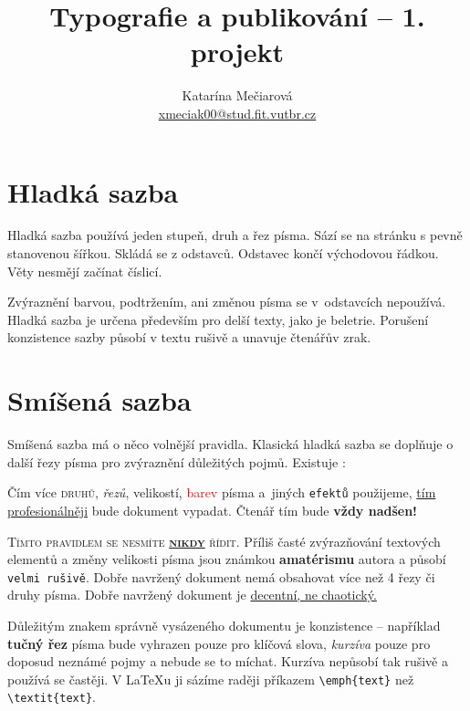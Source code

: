 \documentclass[a4paper, 10pt, twocolumn]{article}[25.2.2024]
\title{Typografie a publikování -- 1. projekt}
\author{Katarína Mečiarová\\ \href{mailto: xmeciak00@stud.fit.vutbr.cz}{xmeciak00@stud.fit.vutbr.cz}}
\date{ }
\begin{document}
    \maketitle


    \section{Hladká sazba}
        Hladká sazba používá jeden stupeň, druh a řez písma.
        Sází se na stránku s pevně stanovenou šířkou.
        Skládá se z odstavců. Odstavec končí východovou řádkou.
        Věty nesmějí začínat číslicí.

        Zvýraznění barvou, podtržením, ani změnou písma se v~odstavcích nepoužívá.
        Hladká sazba je určena především pro delší texty, jako je beletrie.
        Porušení konzistence sazby působí v textu rušivě a unavuje čtenářův zrak.

    \section{Smíšená sazba}
        Smíšená sazba má o něco volnější pravidla.
        Klasická hladká sazba se doplňuje o další řezy písma pro zvýraznění důležitých pojmů.
        Existuje :

        \medskip
        \begin{adjustwidth}{0.75cm}{0.75cm}
        \hspace{0.3cm}
        Čím více \textsc{druhů}, \emph{řezů}, {\scriptsize velikostí}, \textcolor{red}{barev} písma a~jiných \texttt{efektů} použijeme, \underline{tím profesionálněji}
        bude {\selectfont dokument} vypadat. Čtenář tím bude {\Large \bfseries vždy nadšen!}
        \end{adjustwidth}
        \medskip

        \textsc{Tímto pravidlem se nesmíte \underline{\textbf{nikdy}} řídit.}
        Příliš časté zvýrazňování textových elementů a změny {\tiny velikosti} písma jsou známkou \textbf{amatérismu} autora a působí \texttt{velmi rušivě}.
        Dobře navržený dokument nemá obsahovat více než 4 řezy či druhy písma.
        Dobře navržený dokument je \underline{decentní, ne chaotický.}

        Důležitým znakem správně vysázeného dokumentu je konzistence -- například \textbf{tučný řez} písma bude vyhrazen pouze pro klíčová slova, \textit{kurzíva} pouze pro doposud neznámé pojmy a nebude se to míchat.
        Kurzíva nepůsobí tak rušivě a používá se častěji.
        V \LaTeX u ji sázíme raději příkazem \verb|\emph{text}| než \verb|\textit{text}|.
\end{document}
